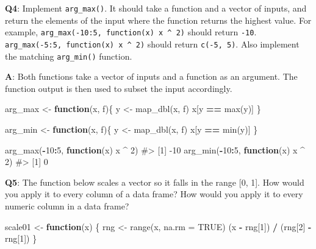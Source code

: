 \documentclass[
]{krantz}
\makeatletter
\newenvironment{Shaded}{\begin{snugshade}}{\end{snugshade}}
\newcommand{\CommentTok}[1]{\textcolor[rgb]{0.56,0.35,0.01}{\textit{#1}}}
\newcommand{\ControlFlowTok}[1]{\textcolor[rgb]{0.13,0.29,0.53}{\textbf{#1}}}
\newcommand{\DataTypeTok}[1]{\textcolor[rgb]{0.13,0.29,0.53}{#1}}
\newcommand{\DecValTok}[1]{\textcolor[rgb]{0.00,0.00,0.81}{#1}}
\newcommand{\KeywordTok}[1]{\textcolor[rgb]{0.13,0.29,0.53}{\textbf{#1}}}
\newcommand{\NormalTok}[1]{#1}
\newcommand{\OperatorTok}[1]{\textcolor[rgb]{0.81,0.36,0.00}{\textbf{#1}}}
\newcommand{\OtherTok}[1]{\textcolor[rgb]{0.56,0.35,0.01}{#1}}
\newcommand{\StringTok}[1]{\textcolor[rgb]{0.31,0.60,0.02}{#1}}
\newenvironment{kframe}{%
\medskip{}
\setlength{\fboxsep}{.8em}
 \def\at@end@of@kframe{}%
 \ifinner\ifhmode%
  \def\at@end@of@kframe{\end{minipage}}%
  \begin{minipage}{\columnwidth}%
 \fi\fi%
 \def\FrameCommand##1{\hskip\@totalleftmargin \hskip-\fboxsep
 \colorbox{shadecolor}{##1}\hskip-\fboxsep
     \hskip-\linewidth \hskip-\@totalleftmargin \hskip\columnwidth}%
 \MakeFramed {\advance\hsize-\width
   \@totalleftmargin\z@ \linewidth\hsize
   \@setminipage}}%
 {\par\unskip\endMakeFramed%
 \at@end@of@kframe}
\renewenvironment{Shaded}{\begin{kframe}}{\end{kframe}}
\renewcommand{\KeywordTok} [1]{\textcolor[rgb]{0.00,0.44,0.13}{{#1}}}
\renewcommand{\DataTypeTok}[1]{\textcolor[rgb]{0.56,0.13,0.00}{{#1}}}
\renewcommand{\DecValTok}  [1]{\textcolor[rgb]{0.25,0.63,0.44}{{#1}}}
\renewcommand{\StringTok}  [1]{\textcolor[rgb]{0.25,0.44,0.63}{{#1}}}
\renewcommand{\CommentTok} [1]{\textcolor[rgb]{0.38,0.63,0.69}{{#1}}}
\renewcommand{\OtherTok}   [1]{\textcolor[rgb]{0.00,0.44,0.13}{{#1}}}
\renewcommand{\NormalTok}  [1]{{#1}}
\makeatother
\begin{document}
\textbf{{Q4}}: Implement \texttt{arg\_max()}. It should take a function and a vector of inputs, and return the elements of the input where the function returns the highest value. For example, \texttt{arg\_max(-10:5,\ function(x)\ x\ \^{}\ 2)} should return \texttt{-10}. \texttt{arg\_max(-5:5,\ function(x)\ x\ \^{}\ 2)} should return \texttt{c(-5,\ 5)}. Also implement the matching \texttt{arg\_min()} function.

\textbf{{A}}: Both functions take a vector of inputs and a function as an argument. The function output is then used to subset the input accordingly.

\begin{Shaded}
\begin{Highlighting}[]
\NormalTok{arg_max <-}\StringTok{ }\ControlFlowTok{function}\NormalTok{(x, f)\{}
\NormalTok{  y <-}\StringTok{ }\KeywordTok{map_dbl}\NormalTok{(x, f)}
\NormalTok{  x[y }\OperatorTok{==}\StringTok{ }\KeywordTok{max}\NormalTok{(y)]}
\NormalTok{\}}

\NormalTok{arg_min <-}\StringTok{ }\ControlFlowTok{function}\NormalTok{(x, f)\{}
\NormalTok{  y <-}\StringTok{ }\KeywordTok{map_dbl}\NormalTok{(x, f)}
\NormalTok{  x[y }\OperatorTok{==}\StringTok{ }\KeywordTok{min}\NormalTok{(y)]}
\NormalTok{\}}

\KeywordTok{arg_max}\NormalTok{(}\OperatorTok{-}\DecValTok{10}\OperatorTok{:}\DecValTok{5}\NormalTok{, }\ControlFlowTok{function}\NormalTok{(x) x }\OperatorTok{^}\StringTok{ }\DecValTok{2}\NormalTok{)}
\CommentTok{#> [1] -10}
\KeywordTok{arg_min}\NormalTok{(}\OperatorTok{-}\DecValTok{10}\OperatorTok{:}\DecValTok{5}\NormalTok{, }\ControlFlowTok{function}\NormalTok{(x) x }\OperatorTok{^}\StringTok{ }\DecValTok{2}\NormalTok{)}
\CommentTok{#> [1] 0}
\end{Highlighting}
\end{Shaded}

\textbf{{Q5}}: The function below scales a vector so it falls in the range {[}0, 1{]}. How would you apply it to every column of a data frame? How would you apply it to every numeric column in a data frame?

\begin{Shaded}
\begin{Highlighting}[]
\NormalTok{scale01 <-}\StringTok{ }\ControlFlowTok{function}\NormalTok{(x) \{}
\NormalTok{  rng <-}\StringTok{ }\KeywordTok{range}\NormalTok{(x, }\DataTypeTok{na.rm =} \OtherTok{TRUE}\NormalTok{)}
\NormalTok{  (x }\OperatorTok{-}\StringTok{ }\NormalTok{rng[}\DecValTok{1}\NormalTok{]) }\OperatorTok{/}\StringTok{ }\NormalTok{(rng[}\DecValTok{2}\NormalTok{] }\OperatorTok{-}\StringTok{ }\NormalTok{rng[}\DecValTok{1}\NormalTok{])}
\NormalTok{\}}
\end{Highlighting}
\end{Shaded}
\end{document}
